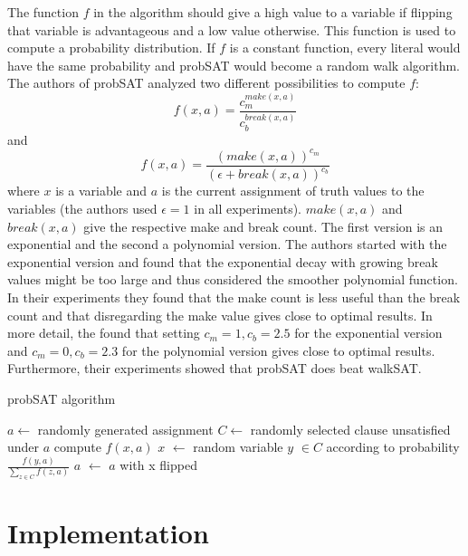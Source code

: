 \documentclass[12pt,a4paper]{article}
\begin{document}
The function $f$ in the algorithm should give a high value to a variable if flipping that variable is advantageous and a low value otherwise. This function is used to compute a probability distribution. If $f$ is a constant function, every literal would have the same probability and probSAT would become a random walk algorithm. \\
The authors of probSAT analyzed two different possibilities to compute $f$:\\
$$f(x,a) = \frac{c_m^{make(x,a)}}{c_b^{break(x,a)}}$$
and
$$f(x,a) = \frac{(make(x,a))^{c_m}}{(\epsilon + break(x,a))^{c_b}}$$
where $x$ is a variable and $a$ is the current assignment of truth values to the variables (the authors used $\epsilon = 1$ in all experiments). $make(x,a)$ and $break(x,a)$ give the respective make and break count. The first version is an exponential and the second a polynomial version. The authors started with the exponential version and found that the exponential decay with growing break values might be too large and thus considered the smoother polynomial function.\\
In their experiments they found that the make count is less useful than the break count and that disregarding the make value gives close to optimal results. In more detail, the found that setting $c_m = 1, c_b = 2.5$ for the exponential version and $c_m = 0, c_b = 2.3$ for the polynomial version gives close to optimal results. \\
Furthermore, their experiments showed that probSAT does beat walkSAT.
\begin{algorithm}[h]
  \caption{probSAT algorithm}
  \label{alg:probSAT}
  \begin{algorithmic}[1]
    \State $a \leftarrow$ randomly generated assignment
    \State {}
    \EndIf
    \State $C \leftarrow$ randomly selected clause unsatisfied under $a$
       \State compute $f(x,a)$
    \EndFor
    \State $x$ $\leftarrow$ random variable $y$ $\in C$ according to probability $\frac{f(y,a)}{\sum_{z \in C}f(z,a)}$
    \State $a$ $\leftarrow$ $a$ with x flipped
    \EndFor
    \EndFor
    \State {}
    \EndProcedure
  \end{algorithmic}
\end{algorithm}  
\section{Implementation}
\end{document}
